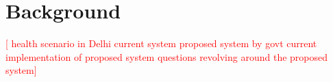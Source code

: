 \section{Background}
\begin{comment}
Build up the context that the reader could read, like a story, to understand more about the problem you’re addressing, the phenomena you are talking about. If the paper is about an internet ban in Bangladesh, tell the story about how the ban was put in place, what was the timeline like, who said what in popular press, and so on. If the research was conducted in the context of an organization of health/outreach workers, talk about the organization, its charter, what it has done/is doing.
\end{comment}
\begin{comment}
With its massive population of over a billion people, India is faced with the logistical challenge of dispensing quality health care to each and every citizen irrespective of geographical location and economic status. Today, even in the capital city of Delhi, there is a vast difference in the level of access and quality of health care received by people from different socio-economic groups.

The Delhi government has proposed an interesting way to tackle this. It is planning to set up a 3-tier system where the lowest tier is a system of ‘Mohalla Clinics’, government clinics in each neighborhood which provide free consultation, tests and medicines. While the existing dispensaries are meant to cater to 50,000 people, each clinic will cater to around 10,000 people in a locality. So far around a hundred clinics have been set up and the government aims to open 1000 such clinics by the end of the year.

According to one doctor I met, the clinics have been set up haphazardly by the government as an immediate response to the crisis. Mohalla clinics are being set up in rented rooms or with pre-made structures around the city. Those running them are doctors coming out of retirement or wanting to give back to society. The government pays the doctors around Rs 30 for every patient they see which is lower than what they would have received at a private practice. The clinics in operation have little in common save the promise to provide quality health care, the facilities available and the staff employed vary.

The two clinics in my area were open only from 9am to 1pm, 6 days a week, during the time many people work. One clinic I visited had a waiting time of around 2 hours while the other had practically no waiting time, though both saw the same number of visitors in a day. At the moment, the clinics are relying on word of mouth to bring new customers. 
*****
\end{comment}
\textcolor{red}{ [
health scenario in Delhi
current system
proposed system by govt
current implementation of proposed system
questions revolving around the proposed system]
}

